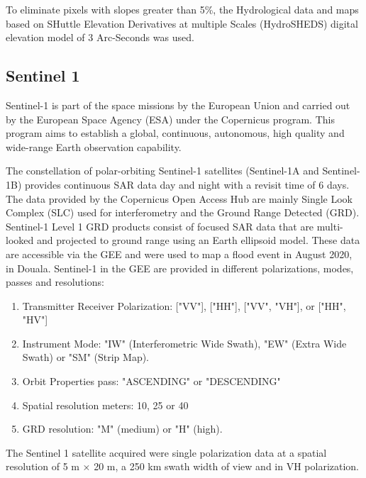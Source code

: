To eliminate pixels with slopes greater than 5\%, the Hydrological data and maps based on SHuttle Elevation Derivatives at multiple Scales (HydroSHEDS) digital elevation model of 3 Arc-Seconds was used. 

\subsection{Sentinel 1}
Sentinel-1 is part of the space missions by the European Union and carried out by the European Space Agency (ESA) under the Copernicus program\cite{Panetti2014,geudtner2014sentinel}. This program aims to establish a global, continuous, autonomous, high quality and wide-range Earth observation capability. 

The constellation of polar-orbiting Sentinel-1 satellites (Sentinel-1A and Sentinel-1B) provides continuous SAR data day and night with a revisit time of 6 days. The data provided by the Copernicus Open Access Hub are mainly Single Look Complex (SLC) used for interferometry and the Ground Range Detected (GRD)\cite{filipponi2019sentinel}. Sentinel-1 Level 1 GRD products consist of focused SAR data that are multi-looked and projected to ground range using an Earth ellipsoid model. These data are accessible via the GEE and were used to map a flood event in August 2020, in Douala.
Sentinel-1 in the GEE are provided in different polarizations, modes, passes and resolutions\cite{ gees1}:
\begin{enumerate}
    \item Transmitter Receiver Polarization: ["VV"], ["HH"], ["VV", "VH"], or ["HH", "HV"]
    \item Instrument Mode: "IW" (Interferometric Wide Swath), "EW" (Extra Wide Swath) or "SM" (Strip Map). 
    \item Orbit Properties pass: "ASCENDING" or "DESCENDING"
    \item Spatial resolution meters: 10, 25 or 40
    \item GRD resolution: "M" (medium) or "H" (high).
\end{enumerate}
The Sentinel 1 satellite acquired were single polarization data at a spatial resolution of 5 m × 20 m, a 250 km swath width of view and in VH polarization.
